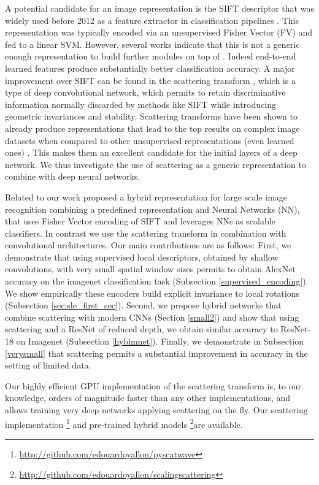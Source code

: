 \documentclass[10pt,twocolumn,letterpaper]{article}
\newcommand{\citep}{\cite}
\begin{document}
A potential candidate for an image representation is the SIFT descriptor \cite{lowe1999object} that was widely used before 2012 as a feature extractor in classification pipelines \cite{sanchez2011high,sanchez2013image}. This representation was typically encoded via an unsupervised Fisher Vector (FV) and fed to a linear SVM. However, several works indicate that this is not a generic enough representation to build further modules on top of  \cite{le2011learning,bo2013multipath}. Indeed end-to-end learned features produce substantially better classification accuracy.
A major improvement over SIFT can be found in the scattering transform \cite{mallat2012group,bruna2013invariant,sifre2013rotation}, which is a type of deep convolutional network, which permits to retain discriminative information normally discarded by methods like SIFT while introducing geometric invariances and stability. Scattering transforms have been shown to already produce representations that lead to the top results on complex image datasets when compared to other unsupervised representations (even learned ones) \citep{oyallon2015deep}. This makes them an excellent candidate for the initial layers of a deep network. We thus investigate the use of scattering as a generic representation to combine with deep neural networks.

Related to our work \cite{perronnin2015fisher} proposed a hybrid representation for large scale image recognition combining a predefined representation and Neural Networks (NN), that uses Fisher Vector encoding of SIFT and leverages NNs as scalable classifiers. In contrast we use the scattering transform in combination with convolutional architectures. Our main contributions are as follows: First, we demonstrate that using supervised local descriptors, obtained by shallow  convolutions, with very small spatial window sizes permits to obtain AlexNet accuracy on the imagenet classification task (Subsection \ref{supervised_encoding}). We show empirically these encoders build explicit invariance to local rotations (Subsection \ref{sec:sle_first_sec}). Second, we propose hybrid networks that combine scattering with modern CNNs  (Section \ref{small2}) and show that using scattering and a ResNet of reduced depth, we obtain similar accuracy to ResNet-18 on Imagenet (Subsection \ref{hybimnet}). Finally, we demonstrate in Subsection \ref{verysmall} that scattering permits a substantial improvement in accuracy in the setting of limited data.  

Our highly efficient GPU implementation of the scattering transform is, to our knowledge, orders of magnitude faster than any other implementations, and allows training very deep networks applying scattering on the fly. Our scattering implementation \footnote{\url{http://github.com/edouardoyallon/pyscatwave}} and pre-trained hybrid models \footnote{\url{http://github.com/edouardoyallon/scalingscattering}}are available.
\end{document}
